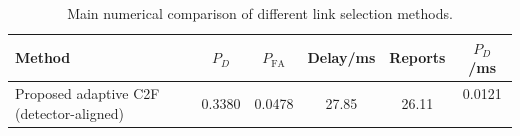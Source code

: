 \begin{table}[t]
    \centering
    \caption{Main numerical comparison of different link selection methods.}
    \label{tab:main_summary}
    \begin{tabular}{l c c c c c}
        \hline
        Method & $P_D$ & $P_{\mathrm{FA}}$ & Delay/ms & Reports & $P_D$/ms \\
        \hline
        Proposed adaptive C2F (detector-aligned) & 0.3380 & 0.0478 & 27.85 & 26.11 & 0.0121 \
        \hline
    \end{tabular}
\end{table}
